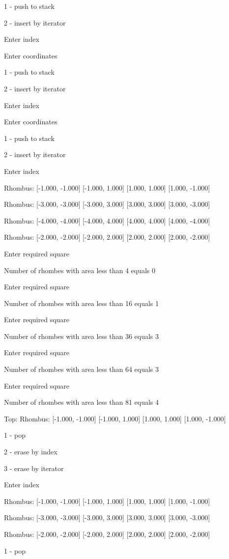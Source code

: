 \documentclass[a4paper, 12pt]{article}
\begin{document}
1 - push to stack

2 - insert by iterator

Enter index

Enter coordinates

1 - push to stack

2 - insert by iterator

Enter index

Enter coordinates

1 - push to stack

2 - insert by iterator

Enter index

Rhombus: [-1.000, -1.000] [-1.000, 1.000] [1.000, 1.000] [1.000, -1.000] 

Rhombus: [-3.000, -3.000] [-3.000, 3.000] [3.000, 3.000] [3.000, -3.000] 

Rhombus: [-4.000, -4.000] [-4.000, 4.000] [4.000, 4.000] [4.000, -4.000] 

Rhombus: [-2.000, -2.000] [-2.000, 2.000] [2.000, 2.000] [2.000, -2.000] 

Enter required square

Number of rhombes with area less than 4 equals 0

Enter required square

Number of rhombes with area less than 16 equals 1

Enter required square

Number of rhombes with area less than 36 equals 3

Enter required square

Number of rhombes with area less than 64 equals 3

Enter required square

Number of rhombes with area less than 81 equals 4

Top: Rhombus: [-1.000, -1.000] [-1.000, 1.000] [1.000, 1.000] [1.000, -1.000] 

1 - pop

2 - erase by index

3 - erase by iterator

Enter index

Rhombus: [-1.000, -1.000] [-1.000, 1.000] [1.000, 1.000] [1.000, -1.000] 

Rhombus: [-3.000, -3.000] [-3.000, 3.000] [3.000, 3.000] [3.000, -3.000] 

Rhombus: [-2.000, -2.000] [-2.000, 2.000] [2.000, 2.000] [2.000, -2.000] 

1 - pop
\end{document}
